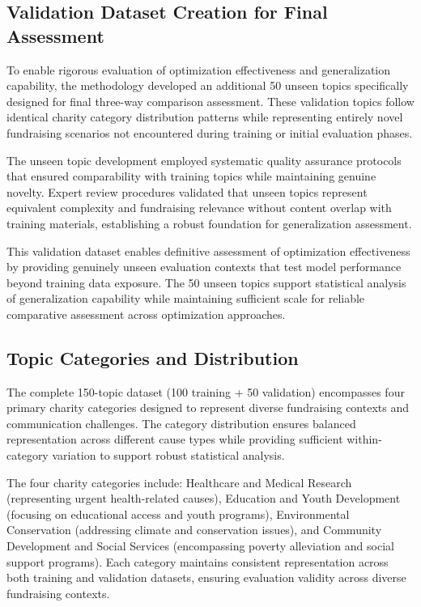 \subsection{Validation Dataset Creation for Final Assessment}

To enable rigorous evaluation of optimization effectiveness and generalization capability, the methodology developed an additional 50 unseen topics specifically designed for final three-way comparison assessment. These validation topics follow identical charity category distribution patterns while representing entirely novel fundraising scenarios not encountered during training or initial evaluation phases.

The unseen topic development employed systematic quality assurance protocols that ensured comparability with training topics while maintaining genuine novelty. Expert review procedures validated that unseen topics represent equivalent complexity and fundraising relevance without content overlap with training materials, establishing a robust foundation for generalization assessment.

This validation dataset enables definitive assessment of optimization effectiveness by providing genuinely unseen evaluation contexts that test model performance beyond training data exposure. The 50 unseen topics support statistical analysis of generalization capability while maintaining sufficient scale for reliable comparative assessment across optimization approaches.

\subsection{Topic Categories and Distribution}

The complete 150-topic dataset (100 training + 50 validation) encompasses four primary charity categories designed to represent diverse fundraising contexts and communication challenges. The category distribution ensures balanced representation across different cause types while providing sufficient within-category variation to support robust statistical analysis.

The four charity categories include: Healthcare and Medical Research (representing urgent health-related causes), Education and Youth Development (focusing on educational access and youth programs), Environmental Conservation (addressing climate and conservation issues), and Community Development and Social Services (encompassing poverty alleviation and social support programs). Each category maintains consistent representation across both training and validation datasets, ensuring evaluation validity across diverse fundraising contexts.

